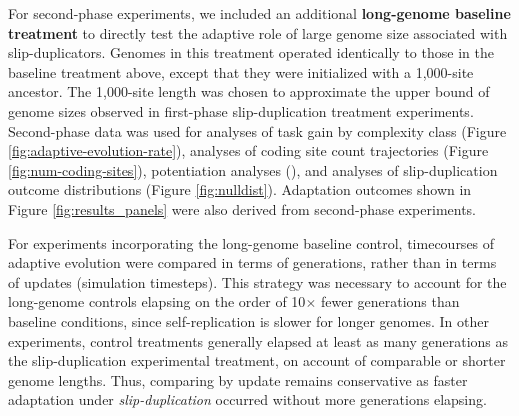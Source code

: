 For second-phase experiments, we included an additional \textbf{long-genome baseline treatment} to directly test the adaptive role of large genome size associated with slip-duplicators.
Genomes in this treatment operated identically to those in the baseline treatment above, except that they were initialized with a 1,000-site ancestor.
The 1,000-site length was chosen to approximate the upper bound of genome sizes observed in first-phase slip-duplication treatment experiments.
Second-phase data was used for analyses of task gain by complexity class (Figure \ref{fig:adaptive-evolution-rate}), analyses of coding site count trajectories (Figure \ref{fig:num-coding-sites}), potentiation analyses (), and analyses of slip-duplication outcome distributions (Figure \ref{fig:nulldist}).
Adaptation outcomes shown in Figure \ref{fig:results_panels} were also derived from second-phase experiments.

For experiments incorporating the long-genome baseline control, timecourses of adaptive evolution were compared in terms of generations, rather than in terms of updates (simulation timesteps).
This strategy was necessary to account for the long-genome controls elapsing on the order of 10$\times$ fewer generations than baseline conditions, since self-replication is slower for longer genomes.
In other experiments, control treatments generally elapsed at least as many generations as the slip-duplication experimental treatment, on account of comparable or shorter genome lengths.
Thus, comparing by update remains conservative as faster adaptation under \textit{slip-duplication} occurred without more generations elapsing.


